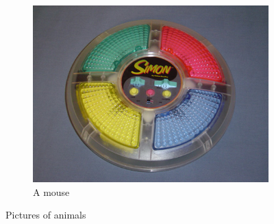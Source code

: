 \begin{figure}
\begin{subfigure}{0.3\textwidth}
        \includegraphics[width=\textwidth]{./images/Simon_game.jpg}
        \caption{A mouse}
        \label{fig:mouse}
    \end{subfigure}
    \caption{Pictures of animals}\label{fig:animals}
\end{figure}
